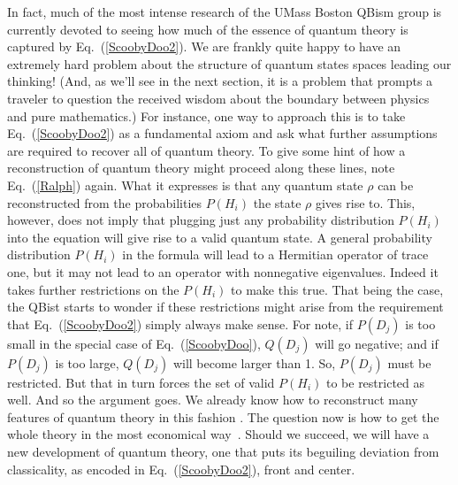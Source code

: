 \documentclass[aps,pra,superscriptaddress,10pt,tightenlines,twocolumn,nofootinbib]{revtex4}
\begin{document}
In fact, much of the most intense research of the UMass Boston QBism group is currently devoted to seeing how much of the essence of quantum theory is captured by Eq.~(\ref{ScoobyDoo2}).  We are frankly quite happy to have an extremely hard problem about the structure of quantum states spaces leading our thinking!  (And, as we'll see in the next section, it is a problem that prompts a traveler to question the received wisdom about the boundary between physics and pure mathematics.)  For instance, one way to approach this is to take Eq.~(\ref{ScoobyDoo2}) as a fundamental axiom and ask what further assumptions are required to recover all of quantum theory.  To give some hint of how a reconstruction of quantum theory might proceed along these lines, note Eq.~(\ref{Ralph}) again.  What it expresses is that any quantum state $\rho$ can be reconstructed from the probabilities $P(H_i)$ the state $\rho$ gives rise to.  This, however, does not imply that plugging just any probability distribution $P(H_i)$ into the equation will give rise to a valid quantum state.  A general probability distribution $P(H_i)$ in the formula will lead to a Hermitian operator of trace one, but it may not lead to an operator with nonnegative eigenvalues.  Indeed it takes further restrictions on the $P(H_i)$ to make this true.  That being the case, the QBist starts to wonder if these restrictions might arise from the requirement that Eq.~(\ref{ScoobyDoo2}) simply always make sense.  For note, if $P(D_j)$ is too small in the special case of Eq.~(\ref{ScoobyDoo}), $Q(D_j)$ will go negative; and if $P(D_j)$ is too large, $Q(D_j)$ will become larger than 1.  So, $P(D_j)$ must be restricted.  But that in turn forces the set of valid $P(H_i)$ to be restricted as well.  And so the argument goes.  We already know how to reconstruct many features of quantum theory in this fashion \cite{RMP,Appleby09a,Fuchs09b,Appleby09b}.  The question now is how to get the whole theory in the most economical way~\cite{qplex}.  Should we succeed, we will have a new development of quantum theory, one that puts its beguiling deviation from classicality, as encoded in Eq.~(\ref{ScoobyDoo2}), front and center.
\end{document}
